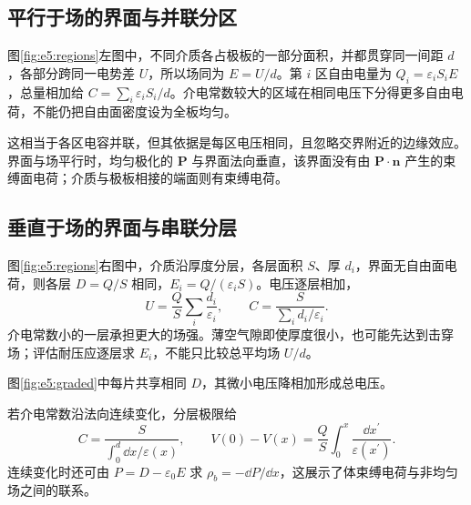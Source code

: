 \subsection{平行于场的界面与并联分区}

图\ref{fig:e5:regions}左图中，不同介质各占极板的一部分面积，并都贯穿同一间距 $d$，各部分跨同一电势差 $U$，所以场同为 $E=U/d$。第 $i$ 区自由电量为 $Q_i=\varepsilon_iS_iE$，总量相加给 $C=\sum_i\varepsilon_iS_i/d$。介电常数较大的区域在相同电压下分得更多自由电荷，不能仍把自由面密度设为全板均匀。

这相当于各区电容并联，但其依据是每区电压相同，且忽略交界附近的边缘效应。界面与场平行时，均匀极化的 $\bm P$ 与界面法向垂直，该界面没有由 $\bm P\cdot\bm n$ 产生的束缚面电荷；介质与极板相接的端面则有束缚电荷。

\subsection{垂直于场的界面与串联分层}

图\ref{fig:e5:regions}右图中，介质沿厚度分层，各层面积 $S$、厚 $d_i$，界面无自由面电荷，则各层 $D=Q/S$ 相同，$E_i=Q/(\varepsilon_iS)$。电压逐层相加，
\[
 U=\frac QS\sum_i\frac{d_i}{\varepsilon_i},\qquad
 C=\frac S{\sum_i d_i/\varepsilon_i}.
\]
介电常数小的一层承担更大的场强。薄空气隙即使厚度很小，也可能先达到击穿场；评估耐压应逐层求 $E_i$，不能只比较总平均场 $U/d$。

\par 图\ref{fig:e5:graded}中每片共享相同 $D$，其微小电压降相加形成总电压。

若介电常数沿法向连续变化，分层极限给
\[
 C=\frac S{\int_0^d\dd x/\varepsilon(x)},\qquad
 V(0)-V(x)=\frac QS\int_0^x\frac{\dd x^\prime}{\varepsilon(x^\prime)}.
\]
连续变化时还可由 $P=D-\varepsilon_0E$ 求 $\rho_b=-\dd P/\dd x$，这展示了体束缚电荷与非均匀场之间的联系。


